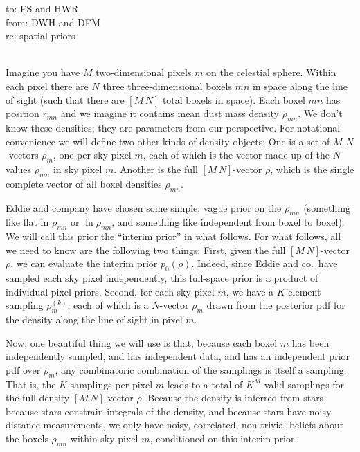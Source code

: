 \documentclass[12pt, letterpaper]{article}
\begin{document}
\noindent
to:  ES and HWR\\[1ex]
from:  DWH and DFM\\[1ex]
re: spatial priors\\[1ex]
~

Imagine you have $M$ two-dimensional pixels $m$ on the celestial sphere.
Within each pixel there are $N$ three three-dimensional boxels $mn$ in space along the line of sight
  (such that there are $[M\,N]$ total boxels in space).
Each boxel $mn$ has position $r_{mn}$ and we imagine it contains mean dust mass density $\rho_{mn}$.
We don't know these densities;
  they are parameters from our perspective.
For notational convenience we will define two other kinds of density objects:
One is a set of $M$ $N$-vectors $\rho_m$, one per sky pixel $m$,
  each of which is the vector made up of the $N$ values $\rho_{mn}$ in sky pixel $m$.
Another is the full $[M\,N]$-vector $\rho$,
  which is the single complete vector of all boxel densities $\rho_{mn}$.

Eddie and company have chosen some simple, vague prior on the $\rho_{mn}$
  (something like flat in $\rho_{mn}$ or $\ln\rho_{mn}$, and something like independent from boxel to boxel).
We will call this prior the ``interim prior'' in what follows.
For what follows, all we need to know are the following two things:
First, given the full $[M\,N]$-vector $\rho$,
  we can evaluate the interim prior $p_0(\rho)$.
Indeed, since Eddie and co.\ have sampled each sky pixel independently,
  this full-space prior is a product of individual-pixel priors.
Second, for each sky pixel $m$, we have a $K$-element sampling $\rho_{m}^{(k)}$,
  each of which is a $N$-vector $\rho_m$ drawn from the posterior pdf
  for the density along the line of sight in pixel $m$.

Now, one beautiful thing we will use is that,
  because each boxel $m$ has been independently sampled,
  and has independent data,
  and has an independent prior pdf over $\rho_m$,
  any combinatoric combination of the samplings is itself a sampling.
That is, the $K$ samplings per pixel $m$
  leads to a total of $K^M$ valid samplings for the full density $[M\,N]$-vector $\rho$.
Because the density is inferred from stars,
  because stars constrain integrals of the density,
  and because stars have noisy distance measurements,
  we only have noisy, correlated, non-trivial beliefs about the boxels $\rho_{mn}$ within sky pixel $m$,
  conditioned on this interim prior.
\end{document}
